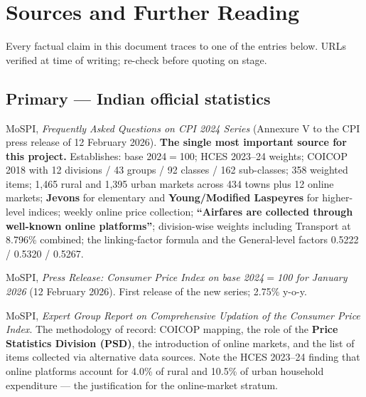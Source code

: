 \chapter{Sources and Further Reading}
\sloppy

Every factual claim in this document traces to one of the entries below. URLs verified at
time of writing; re-check before quoting on stage.

\section{Primary --- Indian official statistics}

\begin{enumerate}[label={[\arabic*]}]
\item MoSPI, \emph{Frequently Asked Questions on CPI 2024 Series} (Annexure V to the CPI
press release of 12 February 2026). \textbf{The single most important source for this
project.} Establishes: base 2024$=$100; HCES 2023--24 weights; COICOP 2018 with 12
divisions / 43 groups / 92 classes / 162 sub-classes; 358 weighted items; 1{,}465 rural and
1{,}395 urban markets across 434 towns plus 12 online markets; \textbf{Jevons} for
elementary and \textbf{Young/Modified Laspeyres} for higher-level indices; weekly online
price collection; \textbf{``Airfares are collected through well-known online platforms''};
division-wise weights including Transport at 8.796\% combined; the linking-factor formula and
the General-level factors 0.5222 / 0.5320 / 0.5267.\\

\item MoSPI, \emph{Press Release: Consumer Price Index on base 2024$=$100 for January 2026}
(12 February 2026). First release of the new series; 2.75\% y-o-y.\\

\item MoSPI, \emph{Expert Group Report on Comprehensive Updation of the Consumer Price
Index}. The methodology of record: COICOP mapping, the role of the \textbf{Price Statistics
Division (PSD)}, the introduction of online markets, and the list of items collected via
alternative data sources. Note the HCES 2023--24 finding that online platforms account for
4.0\% of rural and 10.5\% of urban household expenditure --- the justification for the
online-market stratum.\\


\end{enumerate}
